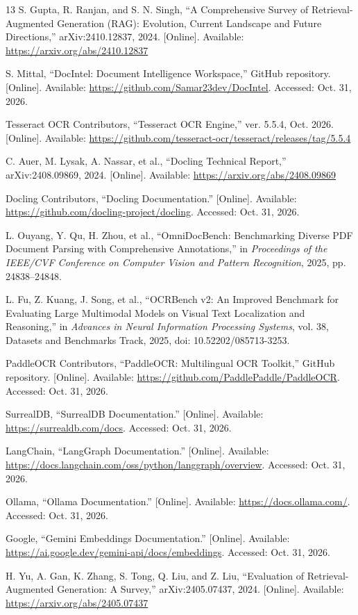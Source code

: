 \documentclass[conference]{IEEEtran}
\begin{document}
\begin{thebibliography}{13}
S. Gupta, R. Ranjan, and S. N. Singh, ``A Comprehensive Survey of Retrieval-Augmented Generation (RAG): Evolution, Current Landscape and Future Directions,'' arXiv:2410.12837, 2024. [Online]. Available: \url{https://arxiv.org/abs/2410.12837}

S. Mittal, ``DocIntel: Document Intelligence Workspace,'' GitHub repository. [Online]. Available: \url{https://github.com/Samar23dev/DocIntel}. Accessed: Oct. 31, 2026.

Tesseract OCR Contributors, ``Tesseract OCR Engine,'' ver. 5.5.4, Oct. 2026. [Online]. Available: \url{https://github.com/tesseract-ocr/tesseract/releases/tag/5.5.4}

C. Auer, M. Lysak, A. Nassar, et al., ``Docling Technical Report,'' arXiv:2408.09869, 2024. [Online]. Available: \url{https://arxiv.org/abs/2408.09869}

Docling Contributors, ``Docling Documentation.'' [Online]. Available: \url{https://github.com/docling-project/docling}. Accessed: Oct. 31, 2026.

L. Ouyang, Y. Qu, H. Zhou, et al., ``OmniDocBench: Benchmarking Diverse PDF Document Parsing with Comprehensive Annotations,'' in \emph{Proceedings of the IEEE/CVF Conference on Computer Vision and Pattern Recognition}, 2025, pp. 24838--24848.

L. Fu, Z. Kuang, J. Song, et al., ``OCRBench v2: An Improved Benchmark for Evaluating Large Multimodal Models on Visual Text Localization and Reasoning,'' in \emph{Advances in Neural Information Processing Systems}, vol. 38, Datasets and Benchmarks Track, 2025, doi: 10.52202/085713-3253.

PaddleOCR Contributors, ``PaddleOCR: Multilingual OCR Toolkit,'' GitHub repository. [Online]. Available: \url{https://github.com/PaddlePaddle/PaddleOCR}. Accessed: Oct. 31, 2026.

SurrealDB, ``SurrealDB Documentation.'' [Online]. Available: \url{https://surrealdb.com/docs}. Accessed: Oct. 31, 2026.

LangChain, ``LangGraph Documentation.'' [Online]. Available: \url{https://docs.langchain.com/oss/python/langgraph/overview}. Accessed: Oct. 31, 2026.

Ollama, ``Ollama Documentation.'' [Online]. Available: \url{https://docs.ollama.com/}. Accessed: Oct. 31, 2026.

Google, ``Gemini Embeddings Documentation.'' [Online]. Available: \url{https://ai.google.dev/gemini-api/docs/embeddings}. Accessed: Oct. 31, 2026.

H. Yu, A. Gan, K. Zhang, S. Tong, Q. Liu, and Z. Liu, ``Evaluation of Retrieval-Augmented Generation: A Survey,'' arXiv:2405.07437, 2024. [Online]. Available: \url{https://arxiv.org/abs/2405.07437}
\end{thebibliography}
\end{document}
